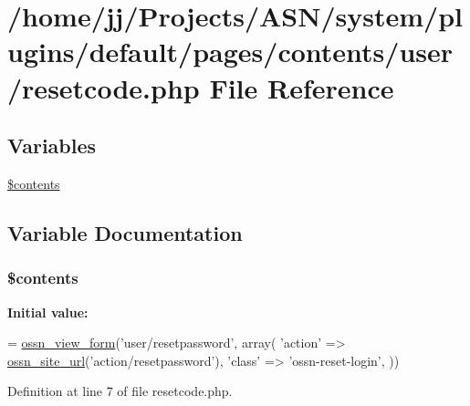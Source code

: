 \hypertarget{resetcode_8php}{}\section{/home/jj/\+Projects/\+A\+S\+N/system/plugins/default/pages/contents/user/resetcode.php File Reference}
\label{resetcode_8php}
\subsection*{Variables}
\begin{DoxyCompactItemize}
\item 
\hyperlink{resetcode_8php_a87e6516f43ab874500590fe9ec8315fb}{\$contents}
\end{DoxyCompactItemize}


\subsection{Variable Documentation}
\subsubsection[{\texorpdfstring{\$contents}{$contents}}]{\setlength{\rightskip}{0pt plus 5cm}\$contents}\hypertarget{resetcode_8php_a87e6516f43ab874500590fe9ec8315fb}{}\label{resetcode_8php_a87e6516f43ab874500590fe9ec8315fb}
{\bfseries Initial value\+:}
\begin{DoxyCode}
= \hyperlink{ossn_8lib_8views_8php_ac874e6342b6bbe7ac279180d7b4dcd2b}{ossn\_view\_form}(\textcolor{stringliteral}{'user/resetpassword'}, array(
                     \textcolor{stringliteral}{'action'} => \hyperlink{ossn_8lib_8system_8php_a2f12f9244f99eccd1225afb76ef2ab65}{ossn\_site\_url}(\textcolor{stringliteral}{'action/resetpassword'}),
                     \textcolor{stringliteral}{'class'} => \textcolor{stringliteral}{'ossn-reset-login'},
            ))
\end{DoxyCode}


Definition at line 7 of file resetcode.\+php.

